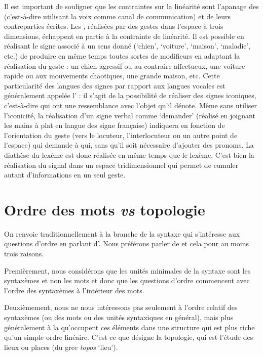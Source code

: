 {     Il est important de souligner que les contraintes sur la linéarité sont l’apanage des  (c’est-à-dire utilisant la voix comme canal de communication) et de leurs contreparties écrites. Les , réalisées par des gestes dans l’espace à trois dimensions, échappent en partie à la contrainte de linéarité. Il est possible en réalisant le signe associé à un sens donné (‘chien’, ‘voiture’, ‘maison’, ‘maladie’, etc.) de produire en même temps toutes sortes de modifieurs en adaptant la réalisation du geste : un chien agressif ou au contraire affectueux, une voiture rapide ou aux mouvements chaotiques, une grande maison, etc. Cette particularité des langues des signes par rapport aux langues vocales est généralement appelée l’ : il s’agit de la possibilité de réaliser des signes iconiques, c’est-à-dire qui ont une ressemblance avec l’objet qu’il dénote. Même sans utiliser l’iconicité, la réalisation d’un signe verbal comme ‘demander’ (réalisé en joignant les mains à plat en langue des signe française) indiquera en fonction de l’orientation du geste (vers le locuteur, l’interlocuteur ou un autre point de l’espace) qui demande à qui, sans qu’il soit nécessaire d’ajouter des pronoms. La diathèse du lexème est donc réalisée en même temps que le lexème. C’est bien la réalisation du signal dans un espace tridimensionnel qui permet de cumuler autant d’informations en un seul geste.
}
\section{Ordre des mots \textit{vs} topologie}\label{sec:3.5.2}

On renvoie traditionnellement à la branche de la syntaxe qui s’intéresse aux questions d’ordre en parlant d’. Nous préférons parler de  et cela pour au moins trois raisons.

Premièrement, nous considérons que les unités minimales de la syntaxe sont les syntaxèmes et non les mots et donc que les questions d’ordre commencent avec l’ordre des syntaxèmes à l’intérieur des mots.

Deuxièmement, nous ne nous intéressons pas seulement à l’ordre relatif des syntaxèmes (ou des mots ou des unités syntaxiques en général), mais plus généralement à la  qu’occupent ces éléments dans une structure qui est plus riche qu’un simple ordre linéaire. C’est ce que désigne la topologie, qui est l’étude des lieux ou places (du grec \textit{topos} ‘lieu’).

